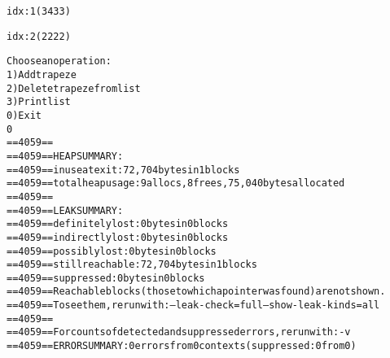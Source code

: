 \begin{alltt}
idx: 1   (3 4 3 3)

idx: 2   (2 2 2 2)


Choose an operation:
1) Add trapeze
2) Delete trapeze from list
3) Print list
0) Exit
0
==4059== 
==4059== HEAP SUMMARY:
==4059==     in use at exit: 72,704 bytes in 1 blocks
==4059==   total heap usage: 9 allocs, 8 frees, 75,040 bytes allocated
==4059== 
==4059== LEAK SUMMARY:
==4059==    definitely lost: 0 bytes in 0 blocks
==4059==    indirectly lost: 0 bytes in 0 blocks
==4059==      possibly lost: 0 bytes in 0 blocks
==4059==    still reachable: 72,704 bytes in 1 blocks
==4059==         suppressed: 0 bytes in 0 blocks
==4059== Reachable blocks (those to which a pointer was found) are not shown.
==4059== To see them, rerun with: --leak-check=full --show-leak-kinds=all
==4059== 
==4059== For counts of detected and suppressed errors, rerun with: -v
==4059== ERROR SUMMARY: 0 errors from 0 contexts (suppressed: 0 from 0)


\end{alltt}

